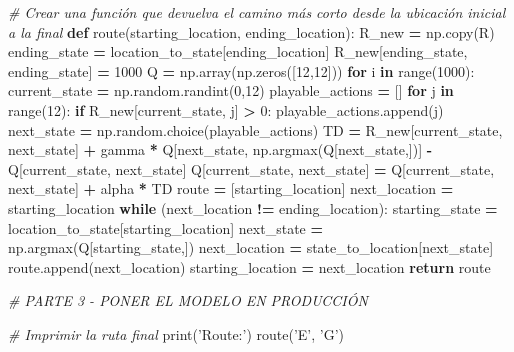 \documentclass[]{book}
\newenvironment{Shaded}{\begin{snugshade}}{\end{snugshade}}
\newcommand{\BuiltInTok}[1]{#1}
\newcommand{\CommentTok}[1]{\textcolor[rgb]{0.56,0.35,0.01}{\textit{#1}}}
\newcommand{\ControlFlowTok}[1]{\textcolor[rgb]{0.13,0.29,0.53}{\textbf{#1}}}
\newcommand{\DecValTok}[1]{\textcolor[rgb]{0.00,0.00,0.81}{#1}}
\newcommand{\KeywordTok}[1]{\textcolor[rgb]{0.13,0.29,0.53}{\textbf{#1}}}
\newcommand{\NormalTok}[1]{#1}
\newcommand{\OperatorTok}[1]{\textcolor[rgb]{0.81,0.36,0.00}{\textbf{#1}}}
\newcommand{\StringTok}[1]{\textcolor[rgb]{0.31,0.60,0.02}{#1}}
\begin{document}
\begin{Shaded}
\begin{Highlighting}[]
\CommentTok{# Crear una función que devuelva el camino más corto desde la ubicación inicial a la final}
\KeywordTok{def}\NormalTok{ route(starting_location, ending_location):}
\NormalTok{    R_new }\OperatorTok{=}\NormalTok{ np.copy(R)}
\NormalTok{    ending_state }\OperatorTok{=}\NormalTok{ location_to_state[ending_location]}
\NormalTok{    R_new[ending_state, ending_state] }\OperatorTok{=} \DecValTok{1000}
\NormalTok{    Q }\OperatorTok{=}\NormalTok{ np.array(np.zeros([}\DecValTok{12}\NormalTok{,}\DecValTok{12}\NormalTok{]))}
    \ControlFlowTok{for}\NormalTok{ i }\KeywordTok{in} \BuiltInTok{range}\NormalTok{(}\DecValTok{1000}\NormalTok{):}
\NormalTok{        current_state }\OperatorTok{=}\NormalTok{ np.random.randint(}\DecValTok{0}\NormalTok{,}\DecValTok{12}\NormalTok{)}
\NormalTok{        playable_actions }\OperatorTok{=}\NormalTok{ []}
        \ControlFlowTok{for}\NormalTok{ j }\KeywordTok{in} \BuiltInTok{range}\NormalTok{(}\DecValTok{12}\NormalTok{):}
            \ControlFlowTok{if}\NormalTok{ R_new[current_state, j] }\OperatorTok{>} \DecValTok{0}\NormalTok{:}
\NormalTok{                playable_actions.append(j)}
\NormalTok{        next_state }\OperatorTok{=}\NormalTok{ np.random.choice(playable_actions)}
\NormalTok{        TD }\OperatorTok{=}\NormalTok{ R_new[current_state, next_state]}
             \OperatorTok{+}\NormalTok{ gamma }\OperatorTok{*}\NormalTok{ Q[next_state, np.argmax(Q[next_state,])]}
             \OperatorTok{-}\NormalTok{ Q[current_state, next_state]}
\NormalTok{        Q[current_state, next_state] }\OperatorTok{=}\NormalTok{ Q[current_state, next_state] }\OperatorTok{+}\NormalTok{ alpha }\OperatorTok{*}\NormalTok{ TD}
\NormalTok{    route }\OperatorTok{=}\NormalTok{ [starting_location]}
\NormalTok{    next_location }\OperatorTok{=}\NormalTok{ starting_location}
    \ControlFlowTok{while}\NormalTok{ (next_location }\OperatorTok{!=}\NormalTok{ ending_location):}
\NormalTok{        starting_state }\OperatorTok{=}\NormalTok{ location_to_state[starting_location]}
\NormalTok{        next_state }\OperatorTok{=}\NormalTok{ np.argmax(Q[starting_state,])}
\NormalTok{        next_location }\OperatorTok{=}\NormalTok{ state_to_location[next_state]}
\NormalTok{        route.append(next_location)}
\NormalTok{        starting_location }\OperatorTok{=}\NormalTok{ next_location}
    \ControlFlowTok{return}\NormalTok{ route}

\CommentTok{# PARTE 3 - PONER EL MODELO EN PRODUCCIÓN}

\CommentTok{# Imprimir la ruta final}
\BuiltInTok{print}\NormalTok{(}\StringTok{'Route:'}\NormalTok{)}
\NormalTok{route(}\StringTok{'E'}\NormalTok{, }\StringTok{'G'}\NormalTok{)}
\end{Highlighting}
\end{Shaded}
\end{document}
